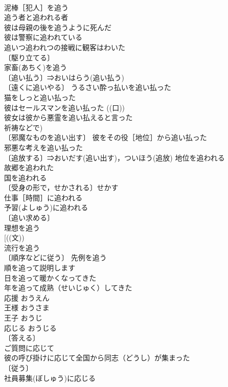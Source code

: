 \documentclass[8pt]{extreport}
\begin{document}
\begin{CJK}{UTF8}{min}
\\	泥棒［犯人］を追う 
\\	追う者と追われる者 
\\	彼は母親の後を追うように死んだ 
\\	彼は警察に追われている 
\\	追いつ追われつの接戦に観客はわいた 
\\	〔駆り立てる〕 
\\	家畜(あちく)を追う 
\\	〔追い払う〕⇒おいはらう(追い払う) 
\\	〔遠くに追いやる〕 うるさい酔っ払いを追い払った 
\\	猫をしっと追い払った 
\\	彼はセールスマンを追い払った ((口)) 
\\	彼女は彼から悪霊を追い払えると言った 
\\	祈祷などで) 
\\	〔邪魔なものを追い出す〕 彼をその役［地位］から追い払った 
\\	邪悪な考えを追い払った 
\\	〔追放する〕⇒おいだす(追い出す)，ついほう(追放) 地位を追われる 
\\	故郷を追われた 
\\	国を追われる 
\\	〔受身の形で，せかされる〕せかす 
\\	仕事［時間］に追われる 
\\	予習(よしゅう)に追われる 
\\	〔追い求める〕
\\	理想を追う 
\\	[((文))
\\	流行を追う 
\\	〔順序などに従う〕 先例を追う 
\\	順を追って説明します 
\\	日を追って暖かくなってきた 
\\	年を追って成熟（せいじゅく）してきた 
\\	応援	おうえん	
\\	王様	おうさま	
\\	王子	おうじ	
\\	応じる	おうじる	
\\	〔答える〕
\\	ご質問に応じて 
\\	彼の呼び掛けに応じて全国から同志（どうし）が集まった 
\\	〔従う〕 
\\	社員募集(ぼしゅう)に応じる 

\end{CJK}
\end{document}
